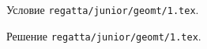 Условие \texttt{regatta/junior/geomt/1.tex}.

\solution Решение \texttt{regatta/junior/geomt/1.tex}.
